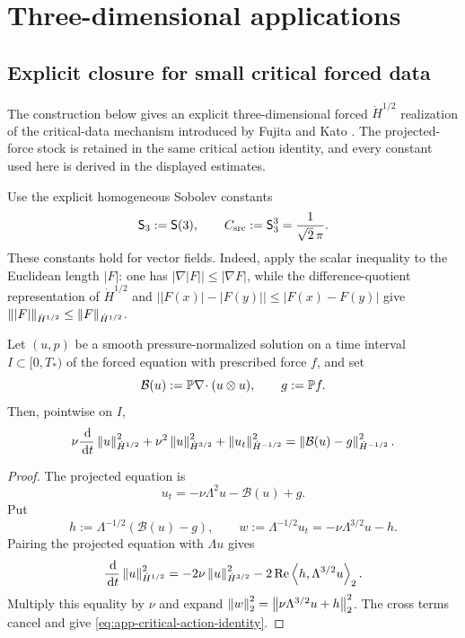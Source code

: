 \section{Three-dimensional applications}
\label{sec:three-dimensional-applications}

\subsection{Explicit closure for small critical forced data}

The construction below gives an explicit three-dimensional forced
\(\dot H^{1/2}\) realization of the critical-data mechanism introduced by
Fujita and Kato \cite{FujitaKato1964}.  The projected-force stock is
retained in the same critical action identity, and every constant used here
is derived in the displayed estimates.

Use the explicit homogeneous Sobolev constants
\[
 \mathsf S_3:=\mathsf S(3),
 \qquad
 C_{\rm src}:=\mathsf S_3^3=\frac1{\sqrt2\,\pi}.
\]
These constants hold for vector fields.  Indeed, apply the scalar
inequality to the Euclidean length \(|F|\): one has
\(|\nabla|F||\le|\nabla F|\), while the difference-quotient representation of
\(\dot H^{1/2}\) and
\(\bigl||F(x)|-|F(y)|\bigr|\le|F(x)-F(y)|\) give
\(\left\lVert |F|\right\rVert_{\dot H^{1/2}}\le\left\lVert F\right\rVert_{\dot H^{1/2}}\).

\begin{lemma}
\label{lem:app-critical-action-identity}
Let \((u,p)\) be a smooth pressure-normalized solution on a time interval
\(I\subset[0,T_*)\) of the forced equation with prescribed force \(f\), and set
\[
 \mathcal B(u):=\mathbb P\nabla\!\cdot(u\otimes u),
 \qquad
 g:=\mathbb P f.
\]
Then, pointwise on \(I\),
\begin{equation}
 \nu\frac{\,\mathrm d}{\,\mathrm d t}\left\lVert u\right\rVert_{\dot H^{1/2}}^2
 +\nu^2\left\lVert u\right\rVert_{\dot H^{3/2}}^2
 +\left\lVert u_t\right\rVert_{\dot H^{-1/2}}^2
 =\left\lVert \mathcal B(u)-g\right\rVert_{\dot H^{-1/2}}^2.
 \label{eq:app-critical-action-identity}
\end{equation}
\end{lemma}

\begin{proof}
The projected equation is
\[
 u_t=-\nu\Lambda^2u-\mathcal B(u)+g.
\]
Put
\[
 h:=\Lambda^{-1/2}(\mathcal B(u)-g),
 \qquad
 w:=\Lambda^{-1/2}u_t=-\nu\Lambda^{3/2}u-h.
\]
Pairing the projected equation with \(\Lambda u\) gives
\[
 \frac{\,\mathrm d}{\,\mathrm d t}\left\lVert u\right\rVert_{\dot H^{1/2}}^2
 =-2\nu\left\lVert u\right\rVert_{\dot H^{3/2}}^2
  -2\operatorname{Re}\left\langle h,\Lambda^{3/2}u\right\rangle_2.
\]
Multiply this equality by \(\nu\) and expand
\(\left\lVert w\right\rVert_2^2=\left\lVert \nu\Lambda^{3/2}u+h\right\rVert_2^2\).
The cross terms cancel and give
\eqref{eq:app-critical-action-identity}.
\end{proof}

